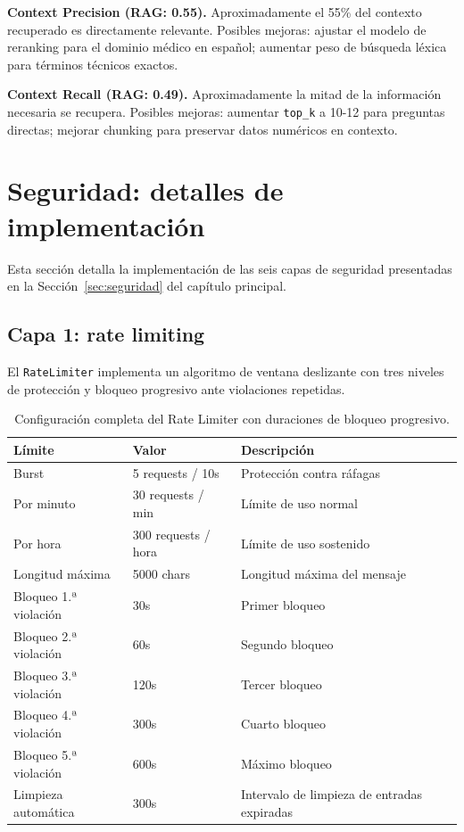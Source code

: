 \textbf{Context Precision (\ac{RAG}: 0.55).} Aproximadamente el 55\% del contexto recuperado es directamente relevante. Posibles mejoras: ajustar el modelo de reranking para el dominio médico en español; aumentar peso de búsqueda léxica para términos técnicos exactos.

\textbf{Context Recall (\ac{RAG}: 0.49).} Aproximadamente la mitad de la información necesaria se recupera. Posibles mejoras: aumentar \texttt{top\_k} a 10-12 para preguntas directas; mejorar chunking para preservar datos numéricos en contexto.

\section{Seguridad: detalles de implementación}
\label{sec:appendix_seguridad}

Esta sección detalla la implementación de las seis capas de seguridad presentadas en la Sección~\ref{sec:seguridad} del capítulo principal.

\subsection{Capa 1: rate limiting}

El \texttt{RateLimiter} implementa un algoritmo de ventana deslizante con tres niveles de protección y bloqueo progresivo ante violaciones repetidas.

\begin{table}[H]
\centering
\caption{Configuración completa del Rate Limiter con duraciones de bloqueo progresivo.}
\label{tab:appendix_ratelimit}
\footnotesize
\begin{tabularx}{\columnwidth}{llX}
\toprule
\textbf{Límite} & \textbf{Valor} & \textbf{Descripción} \\
\midrule
Burst & 5 requests / 10s & Protección contra ráfagas \\
Por minuto & 30 requests / min & Límite de uso normal \\
Por hora & 300 requests / hora & Límite de uso sostenido \\
Longitud máxima & 5000 chars & Longitud máxima del mensaje \\
Bloqueo 1.ª violación & 30s & Primer bloqueo \\
Bloqueo 2.ª violación & 60s & Segundo bloqueo \\
Bloqueo 3.ª violación & 120s & Tercer bloqueo \\
Bloqueo 4.ª violación & 300s & Cuarto bloqueo \\
Bloqueo 5.ª violación & 600s & Máximo bloqueo \\
Limpieza automática & 300s & Intervalo de limpieza de entradas expiradas \\
\bottomrule
\end{tabularx}
\end{table}

